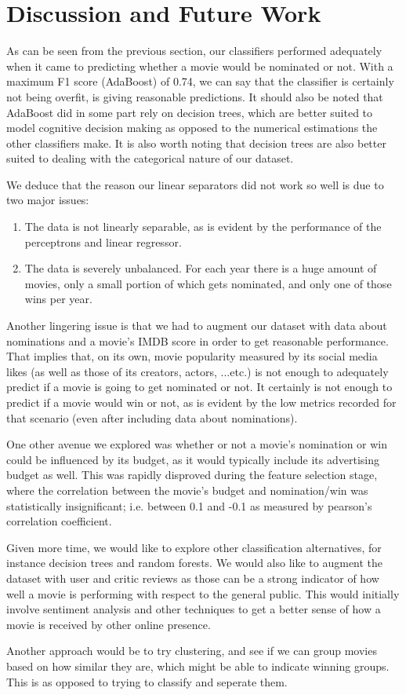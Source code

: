 \documentclass[journal,transmag]{IEEEtran}
\begin{document}
	\section{Discussion and Future Work}
		As can be seen from the previous section, our classifiers performed adequately when it came to predicting whether a movie would be nominated or not. With a maximum F1 score (AdaBoost) of 0.74, we can say that the classifier is certainly not being overfit, is giving reasonable predictions. It should also be noted that AdaBoost did in some part rely on decision trees, which are better suited to model cognitive decision making as opposed to the numerical estimations the other classifiers make. It is also worth noting that decision trees are also better suited to dealing with the categorical nature of our dataset.
		\par
		We deduce that the reason our linear separators did not work so well is due to two major issues:
		\begin{enumerate}
			\item The data is not linearly separable, as is evident by the performance of the perceptrons and linear regressor.
			\item The data is severely unbalanced. For each year there is a huge amount of movies, only a small portion of which gets nominated, and only one of those wins per year.
		\end{enumerate}
		Another lingering issue is that we had to augment our dataset with data about nominations and a movie's IMDB score in order to get reasonable performance. That implies that, on its own, movie popularity measured by its social media likes (as well as those of its creators, actors, ...etc.) is not enough to adequately predict if a movie is going to get nominated or not. It certainly is not enough to predict if a movie would win or not, as is evident by the low metrics recorded for that scenario (even after including data about nominations).
		\par
		One other avenue we explored was whether or not a movie's nomination or win could be influenced by its budget, as it would typically include its advertising budget as well. This was rapidly disproved during the feature selection stage, where the correlation between the movie's budget and nomination/win was statistically insignificant; i.e. between 0.1 and -0.1 as measured by pearson's correlation coefficient.
		\par
		Given more time, we would like to explore other classification alternatives, for instance decision trees and random forests. We would also like to augment the dataset with user and critic reviews as those can be a strong indicator of how well a movie is performing with respect to the general public. This would initially involve sentiment analysis and other techniques to get a better sense of how a movie is received by other online presence.
		\par
		Another approach would be to try clustering, and see if we can group movies based on how similar they are, which might be able to indicate winning groups. This is as opposed to trying to classify  and seperate them.
	
\end{document}
